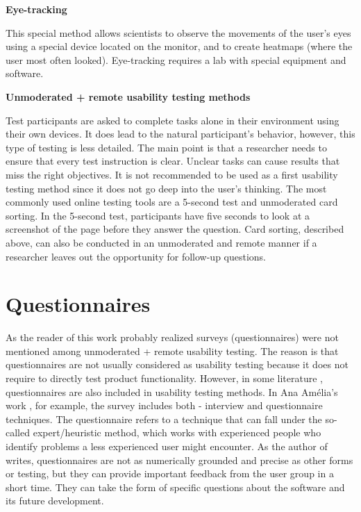 \documentclass[a4paper,10pt,twoside]{article}
\begin{document}
\bigskip

\noindent \textbf {Eye-tracking}

\noindent This special method allows scientists to observe the
movements of the user's eyes using a special device located on the
monitor, and to create heatmaps (where the user most often
looked). Eye-tracking requires a lab with special equipment and
software.

\bigskip

\noindent \textbf {Unmoderated + remote usability testing methods}

\noindent Test participants are asked to complete tasks alone in their
environment using their own devices. It does lead to the natural
participant's behavior, however, this type of testing is less
detailed. The main point is that a researcher needs to ensure that
every test instruction is clear. Unclear tasks can cause results that
miss the right objectives. It is not recommended to be used as a first
usability testing method since it does not go deep into the user’s
thinking. The most commonly used online testing tools are a 5-second
test and unmoderated card sorting. In the 5-second test, participants
have five seconds to look at a screenshot of the page before they
answer the question. Card sorting, described above, can also be
conducted in an unmoderated and remote manner if a researcher leaves
out the opportunity for follow-up questions.

%

\newpage
\vspace*{-1cm}
\section{Questionnaires}
\label{sec:questionnaires}

\noindent As the reader of this work probably realized surveys
(questionnaires) were not mentioned among unmoderated + remote
usability testing. The reason is that questionnaires are not usually
considered as usability testing because it does not require to
directly test product functionality. However, in some literature
\cite{amelia} \cite{sixusability}, questionnaires are also included in
usability testing methods. In Ana Amélia's work \cite{amelia}, for
example, the survey includes both - interview and questionnaire
techniques. The questionnaire refers to a technique that can fall
under the so-called expert/heuristic method, which works with
experienced people who identify problems a less experienced user might
encounter. As the author of \cite{sixusability} writes, questionnaires
are not as numerically grounded and precise as other forms or testing,
but they can provide important feedback from the user group in a short
time. They can take the form of specific questions about the software
and its future development.
\end{document}
